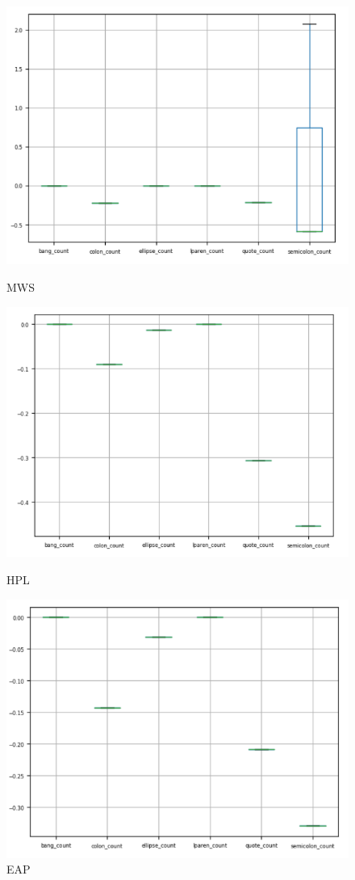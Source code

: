 \documentclass[12pt]{article}
\begin{document}
\begin{figure}[h]
  \begin{multicols}{3}
      \includegraphics[width=\linewidth]{images/punc_mws.png}\par\caption{MWS}
      \includegraphics[width=\linewidth]{images/punc_hpl.png}\par\caption{HPL}
      \includegraphics[width=\linewidth]{images/punc_eap.png}\par\caption{EAP}
  \end{multicols} 


\end{figure}
\end{document}
